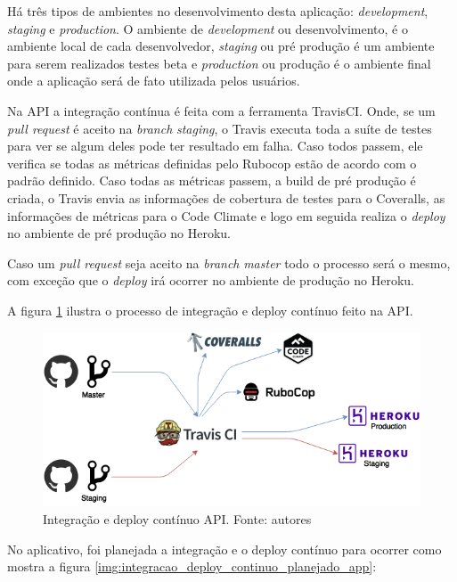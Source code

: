Há três tipos de ambientes no desenvolvimento desta aplicação: \textit{development}, \textit{staging} e \textit{production}. O ambiente de \textit{development} ou desenvolvimento, é o ambiente local de cada desenvolvedor, \textit{staging} ou pré produção é um ambiente para serem realizados testes beta e \textit{production} ou produção é o ambiente final onde a aplicação será de fato utilizada pelos usuários.

Na API a integração contínua é feita com a ferramenta TravisCI. Onde, se um \textit{pull request} é aceito na \textit{branch} \textit{staging}, o Travis executa toda a suíte de testes para ver se algum deles pode ter resultado em falha. Caso todos passem, ele verifica se todas as métricas definidas pelo Rubocop estão de acordo com o padrão definido. Caso todas as métricas passem, a build de pré produção é criada, o Travis envia as informações de cobertura de testes para o Coveralls, as informações de métricas para o Code Climate e logo em seguida realiza o \textit{deploy} no ambiente de pré produção no Heroku.

Caso um \textit{pull request} seja aceito na \textit{branch} \textit{master} todo o processo será o mesmo, com exceção que o \textit{deploy} irá ocorrer no ambiente de produção no Heroku.

A figura \ref{img:integracao_deploy_continuo_api} ilustra o processo de integração e deploy contínuo feito na API.

\begin{figure}[H]
    \centering
    \includegraphics[scale=0.5]{figuras/api_ci.png}
    \caption[Integração e deploy contínuo API]{Integração e deploy contínuo API. Fonte: autores}
    \label{img:integracao_deploy_continuo_api}
\end{figure}

No aplicativo, foi planejada a integração e o deploy contínuo para ocorrer como mostra a figura \ref{img:integracao_deploy_continuo_planejado_app}:

